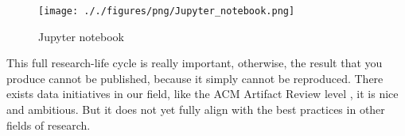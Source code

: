 \begin{figure*}[t]
    \centering
    \texttt{[image: ././figures/png/Jupyter\_notebook.png]}
	\caption{Jupyter notebook }
	\label{fig:Jupyter-notebook}
\end{figure*}
This full research-life cycle is really important, otherwise, the result that you produce cannot be published, because it simply cannot be reproduced. There exists data initiatives in our field, like the ACM Artifact Review level \cite{acm-artifact}, it is nice and ambitious. But it does not yet fully align with the best practices in other fields of research.

